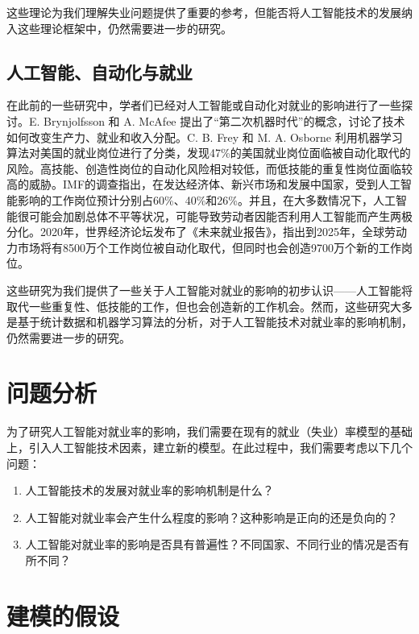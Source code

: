 \documentclass{article}
\begin{document}
这些理论为我们理解失业问题提供了重要的参考，但能否将人工智能技术的发展纳入这些理论框架中，仍然需要进一步的研究。

\subsection{人工智能、自动化与就业}

在此前的一些研究中，学者们已经对人工智能或自动化对就业的影响进行了一些探讨。E. Brynjolfsson 和 A. McAfee 提出了“第二次机器时代”\cite{brynjolfsson2014second}的概念，讨论了技术如何改变生产力、就业和收入分配。C. B. Frey 和 M. A. Osborne\cite{frey2017future} 利用机器学习算法对美国的就业岗位进行了分类，发现47\%的美国就业岗位面临被自动化取代的风险。高技能、创造性岗位的自动化风险相对较低，而低技能的重复性岗位面临较高的威胁。IMF的调查\cite{imf2024ai}指出，在发达经济体、新兴市场和发展中国家，受到人工智能影响的工作岗位预计分别占60\%、40\%和26\%。并且，在大多数情况下，人工智能很可能会加剧总体不平等状况，可能导致劳动者因能否利用人工智能而产生两极分化。2020年，世界经济论坛发布了《未来就业报告》\cite{wef2020futureofjobs}，指出到2025年，全球劳动力市场将有8500万个工作岗位被自动化取代，但同时也会创造9700万个新的工作岗位。

这些研究为我们提供了一些关于人工智能对就业的影响的初步认识——人工智能将取代一些重复性、低技能的工作，但也会创造新的工作机会。然而，这些研究大多是基于统计数据和机器学习算法的分析，对于人工智能技术对就业率的影响机制，仍然需要进一步的研究。

\section{问题分析}

为了研究人工智能对就业率的影响，我们需要在现有的就业（失业）率模型的基础上，引入人工智能技术因素，建立新的模型。在此过程中，我们需要考虑以下几个问题：

\begin{enumerate}[label=(\arabic*)]
    \item 人工智能技术的发展对就业率的影响机制是什么？
    \item 人工智能对就业率会产生什么程度的影响？这种影响是正向的还是负向的？
    \item 人工智能对就业率的影响是否具有普遍性？不同国家、不同行业的情况是否有所不同？
\end{enumerate}

\section{建模的假设}
\end{document}

